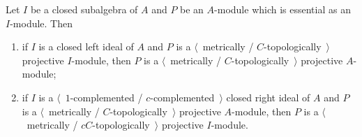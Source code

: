 \begin{proposition}\label{MetTopProjUnderChangeOfAlg} Let $I$ be a closed
subalgebra of $A$ and $P$ be an $A$-module which is essential as an $I$-module.
Then

\begin{enumerate}[label = (\roman*)]
    \item if $I$ is a closed left ideal of $A$ and $P$ is a $\langle$~metrically /
    $C$-topologically~$\rangle$  projective $I$-module, then $P$ is a
    $\langle$~metrically / $C$-topologically~$\rangle$ projective $A$-module;

    \item if $I$ is a $\langle$~$1$-complemented / $c$-complemented~$\rangle$
    closed right ideal of $A$ and $P$ is a $\langle$~metrically /
    $C$-topologically~$\rangle$ projective $A$-module, then $P$ is a
    $\langle$~metrically / $cC$-topologically~$\rangle$ projective $I$-module.
\end{enumerate}
\end{proposition}
